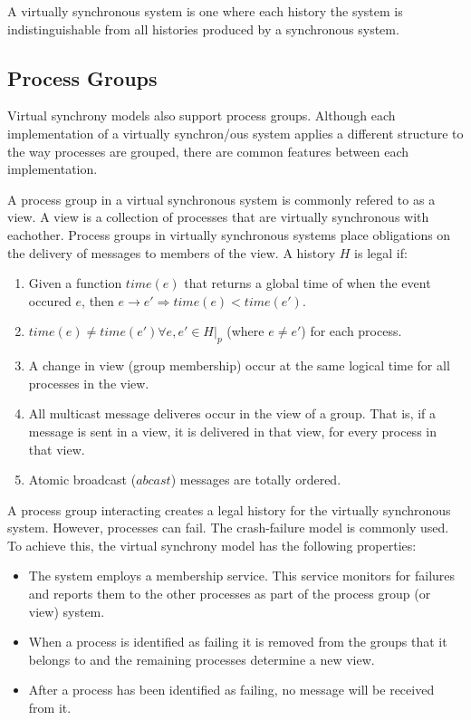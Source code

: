 A virtually synchronous system is one where each history the system is
indistinguishable from all histories produced by a synchronous system.

\subsection{Process Groups}

Virtual synchrony models also support process groups. Although each
implementation of a virtually synchron/ous system applies a different structure
to the way processes are grouped, there are common features between each
implementation.

A process group in a virtual synchronous system is commonly refered to as a
view. A view is a collection of processes that are virtually synchronous
with eachother. Process groups in virtually synchronous systems place 
obligations on the delivery of messages to members of the view. A history
$H$ is legal if:

\begin{enumerate}
    \item Given a function $time(e)$ that returns a global time of when the event occured $e$, then $e \rightarrow e' \Rightarrow time(e) < time(e').$
    \item $time(e) \neq time(e') \forall e, e' \in H|_{p}$ (where $e \neq e'$) for each process.
    \item A change in view (group membership) occur at the same logical time for all processes in the view.
    \item All multicast message deliveres occur in the view of a group. That is, if a message is sent in a view, it is delivered in that view, for every process in that view.
    \item Atomic broadcast ($abcast$) messages are totally ordered.
\end{enumerate}

A process group interacting creates a legal history for the virtually
synchronous system. However, processes can fail. The crash-failure model is
commonly used. To achieve this, the virtual synchrony model has the following
properties:

\begin{itemize}
    \item The system employs a membership service. This service monitors for failures and reports them to the other processes as part of the process group (or view) system.
    \item When a process is identified as failing it is removed from the groups that it belongs to and the remaining processes determine a new view.
    \item After a process has been identified as failing, no message will be received from it.
\end{itemize}

